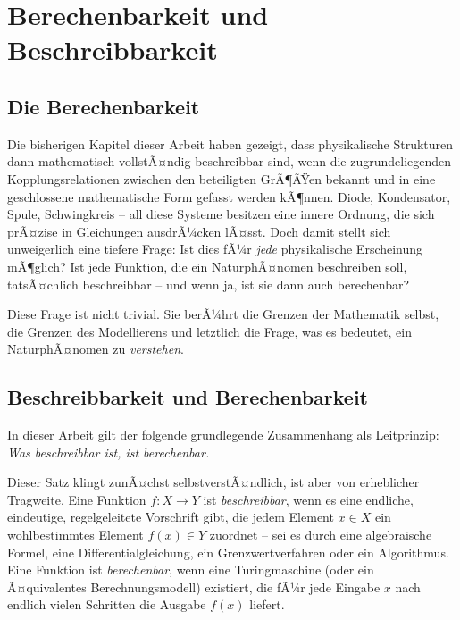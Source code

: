 ﻿\documentclass[12pt, a4paper]{article}
\begin{document}
	\section{Berechenbarkeit und Beschreibbarkeit}
	\label{sec:berechenbarkeit}

	\subsection{Die Berechenbarkeit}

	Die bisherigen Kapitel dieser Arbeit haben gezeigt, dass physikalische Strukturen dann mathematisch vollstÃ¤ndig beschreibbar sind, wenn die zugrundeliegenden Kopplungsrelationen zwischen den beteiligten GrÃ¶ÃŸen bekannt und in eine geschlossene mathematische Form gefasst werden kÃ¶nnen. Diode, Kondensator, Spule, Schwingkreis -- all diese Systeme besitzen eine innere Ordnung, die sich prÃ¤zise in Gleichungen ausdrÃ¼cken lÃ¤sst. Doch damit stellt sich unweigerlich eine tiefere Frage: Ist dies fÃ¼r \textit{jede} physikalische Erscheinung mÃ¶glich? Ist jede Funktion, die ein NaturphÃ¤nomen beschreiben soll, tatsÃ¤chlich beschreibbar -- und wenn ja, ist sie dann auch berechenbar?

	Diese Frage ist nicht trivial. Sie berÃ¼hrt die Grenzen der Mathematik selbst, die Grenzen des Modellierens und letztlich die Frage, was es bedeutet, ein NaturphÃ¤nomen zu \textit{verstehen}.

	\subsection{Beschreibbarkeit und Berechenbarkeit}

	In dieser Arbeit gilt der folgende grundlegende Zusammenhang als Leitprinzip: \textit{Was beschreibbar ist, ist berechenbar.}

	Dieser Satz klingt zunÃ¤chst selbstverstÃ¤ndlich, ist aber von erheblicher Tragweite. Eine Funktion $f: X \to Y$ ist \textit{beschreibbar}, wenn es eine endliche, eindeutige, regelgeleitete Vorschrift gibt, die jedem Element $x \in X$ ein wohlbestimmtes Element $f(x) \in Y$ zuordnet -- sei es durch eine algebraische Formel, eine Differentialgleichung, ein Grenzwertverfahren oder ein Algorithmus. Eine Funktion ist \textit{berechenbar}, wenn eine Turingmaschine (oder ein Ã¤quivalentes Berechnungsmodell) existiert, die fÃ¼r jede Eingabe $x$ nach endlich vielen Schritten die Ausgabe $f(x)$ liefert.
\end{document}
